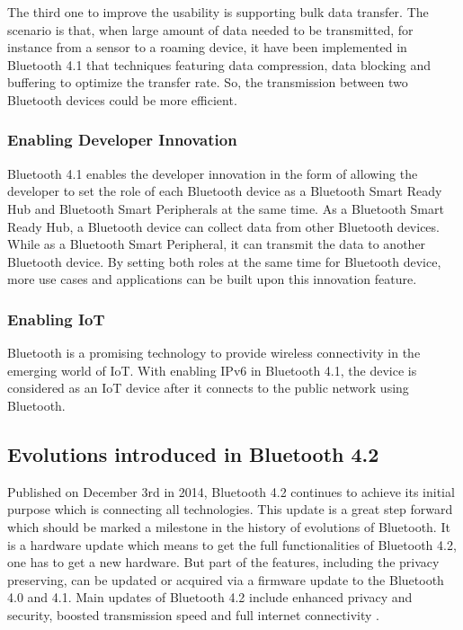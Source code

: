 \documentclass{cseminar}
\begin{document}
The third one to improve the usability is supporting bulk data transfer. The scenario is that, when large amount of data needed to be transmitted, for instance from a sensor to a roaming device, it have been implemented in Bluetooth 4.1 that techniques featuring data compression, data blocking and buffering to optimize the transfer rate. So, the transmission between two Bluetooth devices could be more efficient.

\subsubsection{Enabling Developer Innovation}
Bluetooth 4.1 enables the developer innovation in the form of allowing the developer to set the role of each Bluetooth device as a Bluetooth Smart Ready Hub and Bluetooth Smart Peripherals at the same time. As a Bluetooth Smart Ready Hub, a Bluetooth device can collect data from other Bluetooth devices. While as a Bluetooth Smart Peripheral, it can transmit the data to another Bluetooth device. By setting both roles at the same time for Bluetooth device, more use cases and applications can be built upon this innovation feature.

\subsubsection{Enabling IoT}
Bluetooth is a promising technology to provide wireless connectivity in the emerging world of IoT. With enabling IPv6 in Bluetooth 4.1, the device is considered as an IoT device after it connects to the public network using Bluetooth.
\subsection{Evolutions introduced in Bluetooth 4.2}
Published on December 3rd in 2014, Bluetooth 4.2 continues to achieve its initial purpose which is connecting all technologies. This update is a great step forward which should be marked a milestone in the history of evolutions of Bluetooth. It is a hardware update which means to get the full functionalities of Bluetooth 4.2, one has to get a new hardware. But part of the features, including the privacy preserving, can be updated or acquired via a firmware update to the Bluetooth 4.0 and 4.1. Main updates of Bluetooth 4.2 include enhanced privacy and security, boosted transmission speed and full internet connectivity \cite{BLE_4.2}.
\end{document}
